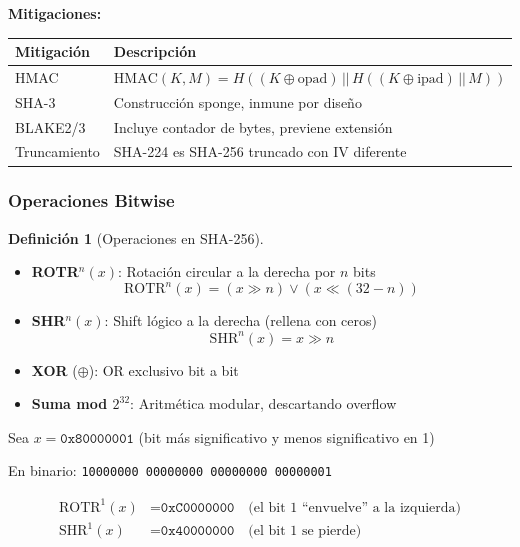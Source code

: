 \documentclass[11pt,a4paper,twoside,openright]{book}
\theoremstyle{definition}
\newtheorem{definition}{Definición}[chapter]
\theoremstyle{plain}
\theoremstyle{remark}
\begin{document}
\textbf{Mitigaciones:}
\begin{center}
\begin{tabular}{lp{9cm}}
\toprule
\textbf{Mitigación} & \textbf{Descripción} \\
\midrule
HMAC & $\text{HMAC}(K, M) = H((K \oplus \text{opad}) \,||\, H((K \oplus \text{ipad}) \,||\, M))$ \\
SHA-3 & Construcción sponge, inmune por diseño \\
BLAKE2/3 & Incluye contador de bytes, previene extensión \\
Truncamiento & SHA-224 es SHA-256 truncado con IV diferente \\
\bottomrule
\end{tabular}
\end{center}

\subsubsection{Operaciones Bitwise}

\begin{definition}[Operaciones en SHA-256]
\begin{itemize}
    \item \textbf{ROTR}$^n(x)$: Rotación circular a la derecha por $n$ bits
    \[ \text{ROTR}^n(x) = (x \gg n) \lor (x \ll (32-n)) \]
    
    \item \textbf{SHR}$^n(x)$: Shift lógico a la derecha (rellena con ceros)
    \[ \text{SHR}^n(x) = x \gg n \]
    
    \item \textbf{XOR} ($\oplus$): OR exclusivo bit a bit
    
    \item \textbf{Suma mod $2^{32}$}: Aritmética modular, descartando overflow
\end{itemize}
\end{definition}

\begin{ejemplo}
Sea $x = \texttt{0x80000001}$ (bit más significativo y menos significativo en 1)

En binario: \texttt{10000000 00000000 00000000 00000001}

\begin{align}
\text{ROTR}^1(x) &= \texttt{0xC0000000} \quad \text{(el bit 1 ``envuelve'' a la izquierda)} \\
\text{SHR}^1(x) &= \texttt{0x40000000} \quad \text{(el bit 1 se pierde)}
\end{align}
\end{ejemplo}
\end{document}
